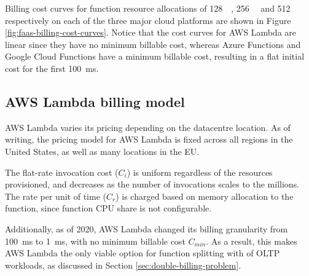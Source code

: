 Billing cost curves for function resource allocations of \SI{128}{\mega\byte}, \SI{256}{\mega\byte} and \SI{512}{\mega\byte} respectively on each of the three major cloud platforms are shown in Figure \ref{fig:faas-billing-cost-curves}. Notice that the cost curves for AWS Lambda are linear since they have no minimum billable cost, whereas Azure Functions and Google Cloud Functions have a minimum billable cost, resulting in a flat initial cost for the first \SI{100}{\milli\second}.

\begin{figure*}[htp]
    \centering
    \quad
    \quad
    \caption{\faas{} billing cost curves by cloud provider}
    \label{fig:faas-billing-cost-curves}
\end{figure*}

\subsection{AWS Lambda billing model}
AWS Lambda varies its pricing depending on the datacentre location. As of writing, the pricing model for AWS Lambda is fixed across all regions in the United States, as well as many locations in the EU\cite{ServerlessComputingAWS}.

The flat-rate invocation cost ($C_i$) is uniform regardless of the resources provisioned, and decreases as the number of invocations scales to the millions. The rate per unit of time ($C_r$) is charged based on memory allocation to the function, since function CPU share is not configurable.

Additionally, as of 2020, AWS Lambda changed its billing granularity from \SI{100}{\milli\second} to \SI{1}{\milli\second}\cite{AWSLambdaChanges}, with no minimum billable cost $C_{min}$. As a result, this makes AWS Lambda the only viable option for function splitting with of OLTP workloads, as discussed in Section \ref{sec:double-billing-problem}.


